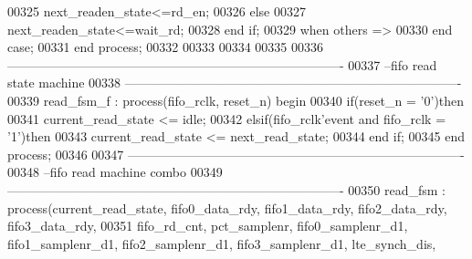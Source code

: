 \begin{DoxyCode}
00325                     \textcolor{vhdlchar}{next_readen_state}\textcolor{vhdlchar}{<=}\textcolor{vhdlchar}{rd\_en};    
00326                 \textcolor{keywordflow}{else}
00327                     \textcolor{vhdlchar}{next_readen_state}\textcolor{vhdlchar}{<=}\textcolor{vhdlchar}{wait\_rd};
00328                 \textcolor{keywordflow}{end} \textcolor{keywordflow}{if};  
00329       \textcolor{keywordflow}{when} \textcolor{keywordflow}{others} \textcolor{vhdlchar}{=}\textcolor{vhdlchar}{>} 
00330       \textcolor{keywordflow}{end} \textcolor{keywordflow}{case};
00331 \textcolor{keywordflow}{end} \textcolor{keywordflow}{process}; 
00332 
00333 
00334 
00335 
00336 \textcolor{keyword}{-------------------------------------------------------------------------------}
00337 \textcolor{keyword}{--fifo read state machine}
00338 \textcolor{keyword}{-------------------------------------------------------------------------------}
00339 read\_fsm\_f : \textcolor{keywordflow}{process}(fifo_rclk, reset_n) \textcolor{keywordflow}{begin}
00340     \textcolor{keywordflow}{if}\textcolor{vhdlchar}{(}\textcolor{vhdlchar}{reset_n} \textcolor{vhdlchar}{=} \textcolor{vhdlchar}{'}\textcolor{vhdllogic}{}\textcolor{vhdllogic}{0}\textcolor{vhdlchar}{'}\textcolor{vhdlchar}{)}\textcolor{keywordflow}{then}
00341         \textcolor{vhdlchar}{current_read_state} \textcolor{vhdlchar}{<=} \textcolor{vhdlchar}{idle};
00342     \textcolor{keywordflow}{elsif}\textcolor{vhdlchar}{(}\textcolor{vhdlchar}{fifo_rclk}\textcolor{vhdlchar}{'}\textcolor{vhdlkeyword}{event} \textcolor{keywordflow}{and} \textcolor{vhdlchar}{fifo_rclk} \textcolor{vhdlchar}{=} \textcolor{vhdlchar}{'}\textcolor{vhdllogic}{}\textcolor{vhdllogic}{1}\textcolor{vhdlchar}{'}\textcolor{vhdlchar}{)}\textcolor{keywordflow}{then} 
00343         \textcolor{vhdlchar}{current_read_state} \textcolor{vhdlchar}{<=} \textcolor{vhdlchar}{next_read_state};
00344     \textcolor{keywordflow}{end} \textcolor{keywordflow}{if}; 
00345 \textcolor{keywordflow}{end} \textcolor{keywordflow}{process};
00346 
00347 \textcolor{keyword}{-------------------------------------------------------------------------------}
00348 \textcolor{keyword}{--fifo read machine combo}
00349 \textcolor{keyword}{-------------------------------------------------------------------------------}
00350 read\_fsm : \textcolor{keywordflow}{process}(current_read_state, fifo0_data_rdy, fifo1_data_rdy, 
      fifo2_data_rdy, fifo3_data_rdy,
00351                             fifo_rd_cnt, pct_samplenr, fifo0_samplenr_d1, 
      fifo1_samplenr_d1, fifo2_samplenr_d1, fifo3_samplenr_d1, lte_synch_dis,

\end{DoxyCode}
